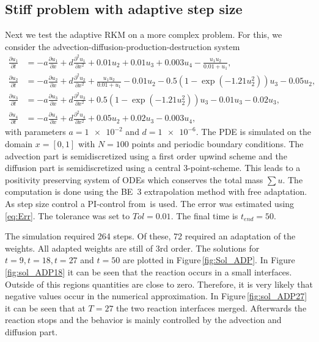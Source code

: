 \documentclass[a4paper]{article}
\numberwithin{equation}{section}
\theoremstyle{plain}
\theoremstyle{definition}
\numberwithin{theorem}{section}
\newcommand{\1}{\mathbbm{1}}
\begin{document}
\subsection{Stiff problem with adaptive step size}

Next we test the adaptive RKM on a more complex problem.
For this, we consider the advection-diffusion-production-destruction system  \cite{kopecz_comparison_2019}
\begin{subequations}
\label{eq:ADR}
\begin{align}
\frac{\partial u_1}{\partial t} &=-a \frac{\partial u_1}{\partial x} + d\frac{\partial^2 u_1}{\partial x ^2} + 0.01u_2 + 0.01 u_3 +0.003u_4 - \frac{u_1 u_2}{0.01+u_1}, \\
\frac{\partial u_2}{\partial t} &=-a \frac{\partial u_2}{\partial x} + d\frac{\partial^2 u_2}{\partial x ^2} + \frac{u_1u_2}{0.01+u_1} -0.01 u_2-0.5(1-\exp(-1.21 u_2^2)) u_3 -0.05 u_2, \\
\frac{\partial u_3}{\partial t} &=-a \frac{\partial u_3}{\partial x} + d\frac{\partial^2 u_3}{\partial x ^2} + 0.5(1-\exp(-1.21u_2^2)) u_3 - 0.01 u_3 -0.02 u_3, \\
\frac{\partial u_4}{\partial t} &=-a \frac{\partial u_4}{\partial x} + d\frac{\partial^2 u_4}{\partial x ^2} + 0.05 u_2 + 0.02 u_3 - 0.003u_4,
\end{align}
\end{subequations}
with parameters $a=\num{1e-2} $ and $ d=\num{1e-6}$.
The PDE is simulated on the domain $x = [0,1]$ with $N=100$ points and periodic boundary conditions.
The advection part is semidiscretized using a first order upwind scheme and the diffusion part is semidiscretized using a central 3-point-scheme. This leads to a positivity preserving system of ODEs which conserves the total mass $\sum u$.
The computation is done using the BE~3 extrapolation
method with free adaptation.
As step size control a PI-control from\,\cite{hairer_solving_1996} is used. The error was estimated using \eqref{eq:Err}. The tolerance was set to $Tol = 0.01$.
The final time is $t_{end} = 50$.

The simulation required 264 steps. Of these, 72 required an adaptation of the weights.
All adapted weights are still of 3rd order.
The solutions for $t=9,t=18,t=27$ and $t=50$ are plotted in Figure\,\ref{fig:Sol_ADP}.
In Figure\,\ref{fig:sol_ADP18} it can be seen that the reaction occurs in a small interfaces.
Outside of this regions quantities are close to zero. Therefore, it is very likely that negative values occur in the numerical approximation.
In Figure\,\ref{fig:sol_ADP27} it can be seen that at $T=27$ the two reaction interfaces merged. Afterwards the reaction stops and the behavior is mainly controlled by the advection and diffusion part.
\end{document}

